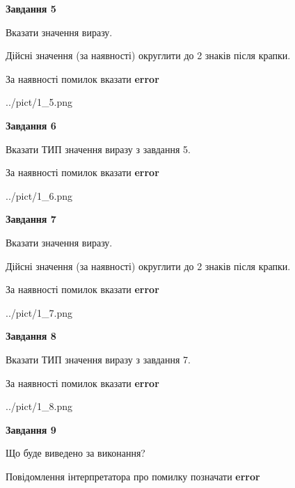 \documentclass[11pt, ukrainian]{article}
\begin{document}
{\begin {large}
{\begin {center}\textbf{Завдання 5}\end {center}}\par
Вказати значення виразу. \par
Дійсні значення (за наявності) округлити до 2 знаків після крапки. \par
За наявності помилок вказати \textbf{error}

\begin{center}
	{../pict/1_5.png}
\end{center}
\newpage

{\begin {center}\textbf{Завдання 6}\end {center}}\par
Вказати ТИП значення виразу з завдання 5. \par
За наявності помилок вказати \textbf{error}

\begin{center}
	{../pict/1_6.png}
\end{center}
\newpage

{\begin {center}\textbf{Завдання 7}\end {center}}\par
Вказати значення виразу. \par
Дійсні значення (за наявності) округлити до 2 знаків після крапки. \par
За наявності помилок вказати \textbf{error}

\begin{center}
	{../pict/1_7.png}
\end{center}
\newpage

{\begin {center}\textbf{Завдання 8}\end {center}}\par
Вказати ТИП значення виразу з завдання 7. \par
За наявності помилок вказати \textbf{error}

\begin{center}
	{../pict/1_8.png}
\end{center}
\newpage

{\begin {center}\textbf{Завдання 9}\end {center}}\par
Що буде виведено за виконання? \par
Повідомлення інтерпретатора про помилку позначати \textbf{error}


\end{large}}
\end{document}

